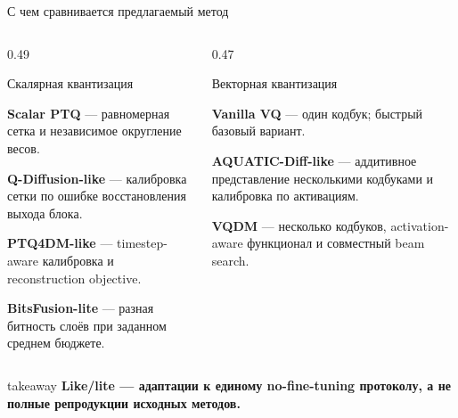 \documentclass[aspectratio=169,10pt]{beamer}
\newcommand{\keypoint}[1]{%
  \begin{beamercolorbox}[
    sep=1.8mm,
    wd=\linewidth
  ]{takeaway}
    \small\bfseries #1
  \end{beamercolorbox}%
}
\begin{document}
\begin{frame}[t]{С чем сравнивается предлагаемый метод}
  \begin{columns}[T,onlytextwidth]

    \begin{column}{0.49\textwidth}
      \begin{block}{Скалярная квантизация}
        \small

        \textbf{Scalar PTQ} --- равномерная сетка
        и независимое округление весов.
        \par\medskip

        \textbf{Q-Diffusion-like} --- калибровка сетки
        по ошибке восстановления выхода блока.
        \par\medskip

        \textbf{PTQ4DM-like} --- timestep-aware калибровка
        и reconstruction objective.
        \par\medskip

        \textbf{BitsFusion-lite} --- разная битность слоёв
        при заданном среднем бюджете.
      \end{block}
    \end{column}

    \begin{column}{0.47\textwidth}
      \begin{block}{Векторная квантизация}
        \small

        \textbf{Vanilla VQ} --- один кодбук;
        быстрый базовый вариант.
        \par\medskip

        \textbf{AQUATIC-Diff-like} --- аддитивное
        представление несколькими кодбуками
        и калибровка по активациям.
        \par\medskip

        \textbf{VQDM} --- несколько кодбуков,
        activation-aware функционал
        и совместный beam search.
      \end{block}
    \end{column}

  \end{columns}

  \vfill

  \keypoint{
    Like/lite --- адаптации к единому no-fine-tuning протоколу,
    а не полные репродукции исходных методов.
  }
\end{frame}

\end{document}
